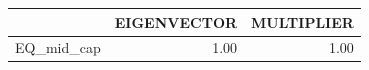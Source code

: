 \begin{tabular}{rrr}
  \hline
 & EIGENVECTOR & MULTIPLIER \\ 
  \hline
EQ\_mid\_cap & 1.00 & 1.00 \\ 
   \hline
\end{tabular}
